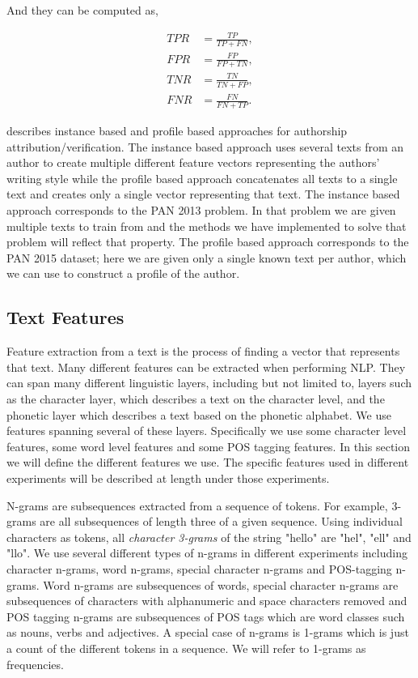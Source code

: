 And they can be computed as,

\begin{align}
    TPR &= \frac{TP}{TP + FN}, \\
    FPR &= \frac{FP}{FP + TN}, \\
    TNR &= \frac{TN}{TN + FP}, \\
    FNR &= \frac{FN}{FN + TP}.
\end{align}

\cite{stamatos2009} describes instance based and profile based approaches for
authorship attribution/verification. The instance based approach uses several
texts from an author to create multiple different feature vectors representing
the authors' writing style while the profile based approach concatenates all
texts to a single text and creates only a single vector representing that text.
The instance based approach corresponds to the PAN 2013 problem. In that problem
we are given multiple texts to train from and the methods we have implemented to
solve that problem will reflect that property. The profile based approach
corresponds to the PAN 2015 dataset; here we are given only a single known text
per author, which we can use to construct a profile of the author.

\subsection{Text Features} \label{subsec:method:text_features} 

Feature extraction from a text is the process of finding a vector that
represents that text. Many different features can be extracted when performing
\gls{NLP}. They can span many different linguistic layers, including but
not limited to, layers such as the character layer, which describes a text
on the character level, and the phonetic layer which describes a text based
on the phonetic alphabet. We use features spanning several of these layers.
Specifically we use some character level features, some word level features and
some \gls{POS} tagging features. In this section we will define the different
features we use. The specific features used in different experiments will be
described at length under those experiments.

N-grams are subsequences extracted from a sequence of tokens. For example,
3-grams are all subsequences of length three of a given sequence. Using
individual characters as tokens, all \textit{character 3-grams} of the string
"hello" are "hel", "ell" and "llo". We use several different types of n-grams
in different experiments including character n-grams, word n-grams, special
character n-grams and \gls{POS}-tagging n-grams. Word n-grams are subsequences
of words, special character n-grams are subsequences of characters with
alphanumeric and space characters removed and \gls{POS} tagging n-grams are
subsequences of \gls{POS} tags which are word classes such as nouns, verbs and
adjectives. A special case of n-grams is 1-grams which is just a count of the
different tokens in a sequence. We will refer to 1-grams as frequencies.

